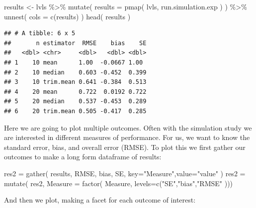 \documentclass[
]{book}
\newenvironment{Shaded}{\begin{snugshade}}{\end{snugshade}}
\newcommand{\AttributeTok}[1]{\textcolor[rgb]{0.77,0.63,0.00}{#1}}
\newcommand{\FunctionTok}[1]{\textcolor[rgb]{0.00,0.00,0.00}{#1}}
\newcommand{\NormalTok}[1]{#1}
\newcommand{\OtherTok}[1]{\textcolor[rgb]{0.56,0.35,0.01}{#1}}
\newcommand{\SpecialCharTok}[1]{\textcolor[rgb]{0.00,0.00,0.00}{#1}}
\newcommand{\StringTok}[1]{\textcolor[rgb]{0.31,0.60,0.02}{#1}}
\begin{document}
\begin{Shaded}
\begin{Highlighting}[]
\NormalTok{results }\OtherTok{\textless{}{-}}\NormalTok{ lvls }\SpecialCharTok{\%\textgreater{}\%} 
  \FunctionTok{mutate}\NormalTok{( }\AttributeTok{results =} \FunctionTok{pmap}\NormalTok{( lvls, run.simulation.exp ) ) }\SpecialCharTok{\%\textgreater{}\%} 
  \FunctionTok{unnest}\NormalTok{( }\AttributeTok{cols =} \FunctionTok{c}\NormalTok{(results) )}
\FunctionTok{head}\NormalTok{( results )}
\end{Highlighting}
\end{Shaded}

\begin{verbatim}
## # A tibble: 6 x 5
##       n estimator  RMSE    bias    SE
##   <dbl> <chr>     <dbl>   <dbl> <dbl>
## 1    10 mean      1.00  -0.0667 1.00 
## 2    10 median    0.603 -0.452  0.399
## 3    10 trim.mean 0.641 -0.384  0.513
## 4    20 mean      0.722  0.0192 0.722
## 5    20 median    0.537 -0.453  0.289
## 6    20 trim.mean 0.505 -0.417  0.285
\end{verbatim}

Here we are going to plot multiple outcomes. Often with the simulation study
we are interested in different measures of performance. For us, we want to
know the standard error, bias, and overall error (RMSE). To plot this we
first gather our outcomes to make a long form dataframe of results:

\begin{Shaded}
\begin{Highlighting}[]
\NormalTok{res2 }\OtherTok{=} \FunctionTok{gather}\NormalTok{( results, RMSE, bias, SE, }\AttributeTok{key=}\StringTok{"Measure"}\NormalTok{,}\AttributeTok{value=}\StringTok{"value"}\NormalTok{ )}
\NormalTok{res2 }\OtherTok{=} \FunctionTok{mutate}\NormalTok{( res2, }\AttributeTok{Measure =} \FunctionTok{factor}\NormalTok{( Measure, }\AttributeTok{levels=}\FunctionTok{c}\NormalTok{(}\StringTok{"SE"}\NormalTok{,}\StringTok{"bias"}\NormalTok{,}\StringTok{"RMSE"}\NormalTok{ )))}
\end{Highlighting}
\end{Shaded}

And then we plot, making a facet for each outcome of interest:
\end{document}
